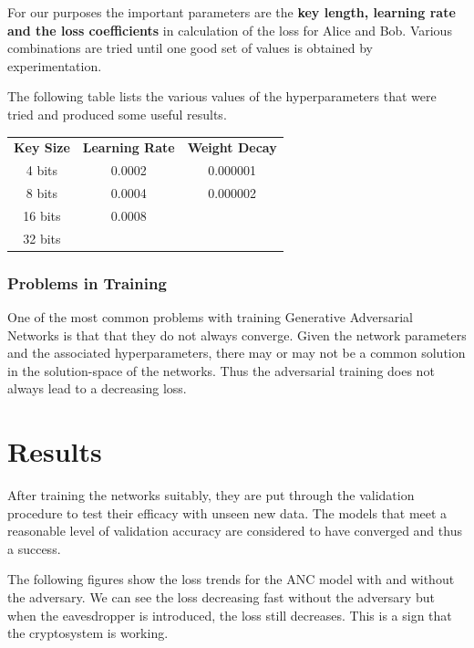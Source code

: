 \documentclass[a4paper]{article}
\begin{document}
      For our purposes the important parameters are the {\bfseries key length, learning rate and the
      loss coefficients} in calculation of the loss for Alice and Bob. Various combinations are tried
      until one good set of values is obtained by experimentation.      

      The following table lists the various values of the hyperparameters that were tried and
      produced some useful results.

      \begin{center}
        \begin{tabular}{ c|c|c }
          \textbf{Key Size} & \textbf{Learning Rate} & \textbf{Weight Decay} \\
          4 bits            & 0.0002                 & 0.000001              \\
          8 bits            & 0.0004                 & 0.000002              \\
          16 bits           & 0.0008                 &                       \\
          32 bits           &                        &                       \\
        \end{tabular}
      \end{center}

      \subsubsection{Problems in Training}
      One of the most common problems with training Generative Adversarial Networks is that that
      they do not always converge. Given the network parameters and the associated hyperparameters,
      there may or may not be a common solution in the solution-space of the networks.
      Thus the adversarial training does not always lead to a decreasing loss.
  
  \newpage
  \section{Results}
  After training the networks suitably, they are put through the validation procedure to test their
  efficacy with unseen new data. The models that meet a reasonable level of validation accuracy are
  considered to have converged and thus a success.

  The following figures show the loss trends for the ANC model with and without the adversary.
  We can see the loss decreasing fast without the adversary but when the eavesdropper is introduced,
  the loss still decreases. This is a sign that the cryptosystem is working.
\end{document}
